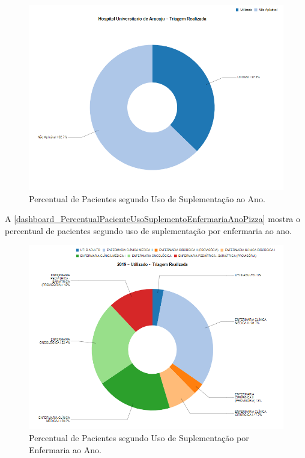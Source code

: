\begin{figure}[htb]
	\caption{\label{dashboard_PercentualPacienteUsoSuplementoHospitalAnoPizza}Percentual de Pacientes segundo Uso de Suplementação ao Ano.}
	\begin{center}
	    \includegraphics[scale=0.6]{Imagens/4.1.PercentualPacienteUsoSuplementoHospitalAnoPizza.png}
	\end{center}
\end{figure}

\newpage
A \autoref{dashboard_PercentualPacienteUsoSuplementoEnfermariaAnoPizza} mostra o percentual de pacientes segundo uso de suplementação por enfermaria ao ano.

\begin{figure}[htb]
	\caption{\label{dashboard_PercentualPacienteUsoSuplementoEnfermariaAnoPizza}Percentual de Pacientes segundo Uso de Suplementação por Enfermaria ao Ano.}
	\begin{center}
	    \includegraphics[scale=0.75]{Imagens/4.3.PercentualPacienteUsoSuplementoEnfermariaAnoPizza.png}
	\end{center}
\end{figure}

